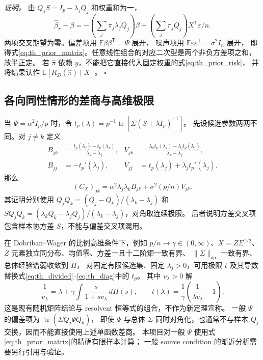 \textit{证明。}
由 $Q_jS=I_p-\lambda_jQ_j$ 和权重和为一，
\begin{equation}\label{eq:th_error_decomp}
 \widehat\beta_\pi-\beta
 =-\left(\sum_j\pi_j\lambda_jQ_j\right)\beta
  +\left(\sum_j\pi_jQ_j\right)X^{\mathsf T}\varepsilon/n.
\end{equation}
两项交叉期望为零。偏差项用 $\mathbb E\beta\beta^{\mathsf T}=\Psi$ 展开，
噪声项用 $\mathbb E\varepsilon\varepsilon^{\mathsf T}=\sigma^2I_n$ 展开，
即得式\eqref{eq:th_prior_matrix}。任意线性组合的对应二次型是两个非负方差项之和，故半正定。
若 $\widehat\pi$ 依赖 $y$，不能把它直接代入固定权重的式\eqref{eq:th_prior_risk}，
并将结果认作 $\mathbb E[R_{\mathcal D}(\widehat\pi)\mid X]$。
\hfill$\square$

\subsection{各向同性情形的差商与高维极限}
当 $\Psi=\alpha^2I_p/p$ 时，令 $t_p(\lambda)=p^{-1}\operatorname{tr}[\Sigma(S+\lambda I_p)^{-1}]$。
先设候选参数两两不同。对 $j\ne k$ 定义
\begin{align}
 B_{jk}&=\frac{t_p(\lambda_j)-t_p(\lambda_k)}{\lambda_k-\lambda_j},&
 V_{jk}&=\frac{\lambda_kt_p(\lambda_k)-\lambda_jt_p(\lambda_j)}{\lambda_k-\lambda_j},\label{eq:th_divided}\\
 B_{jj}&=-t_p'(\lambda_j),&
 V_{jj}&=t_p(\lambda_j)+\lambda_jt_p'(\lambda_j).
 \label{eq:th_diag}
\end{align}
那么
\begin{equation}\label{eq:th_isotropic_matrix}
 (C_X)_{jk}=\alpha^2\lambda_j\lambda_kB_{jk}+\sigma^2(p/n)V_{jk}.
\end{equation}
其证明分别使用
$Q_jQ_k=(Q_j-Q_k)/(\lambda_k-\lambda_j)$ 和
$SQ_jQ_k=(\lambda_kQ_k-\lambda_jQ_j)/(\lambda_k-\lambda_j)$，对角取连续极限。
后者说明方差交叉项包含样本协方差 $S$，不能与偏差交叉项混用。

在 Dobriban--Wager 的比例高维条件下\cite{dw}，例如
$p/n\to\gamma\in(0,\infty)$、$X=Z\Sigma^{1/2}$、$Z$ 元素独立同分布、均值零、方差一且十二阶矩一致有界、
$\lVert\Sigma\rVert_{\mathrm{op}}$ 一致有界、总体经验谱弱收敛到 $H$，
对固定有限候选集、固定 $\lambda_j>0$，可用极限 $t$ 及其导数替换式\eqref{eq:th_divided}--\eqref{eq:th_diag}中的 $t_p$。
其中 $v_\lambda>0$ 解
\begin{equation}\label{eq:th_stieltjes}
 \frac1{v_\lambda}=\lambda+\gamma\int\frac{s}{1+sv_\lambda}\,dH(s),\qquad
 t(\lambda)=\frac1\gamma\left(\frac1{\lambda v_\lambda}-1\right).
\end{equation}
这是现有随机矩阵结论与 resolvent 恒等式的组合，不作为新定理宣称。
一般 $\Psi$ 的偏差项为 $\operatorname{tr}(\Sigma Q_j\Psi Q_k)$，
即使 $\Psi$ 与总体 $\Sigma$ 同时对角化，也通常不与样本 $Q_j$ 交换，因而不能直接使用上述单函数差商。
本项目对一般 $\Psi$ 使用式\eqref{eq:th_prior_matrix}的精确有限样本计算；
一般 source condition 的渐近分析需要另行引用与验证\cite{richards,wu}。

